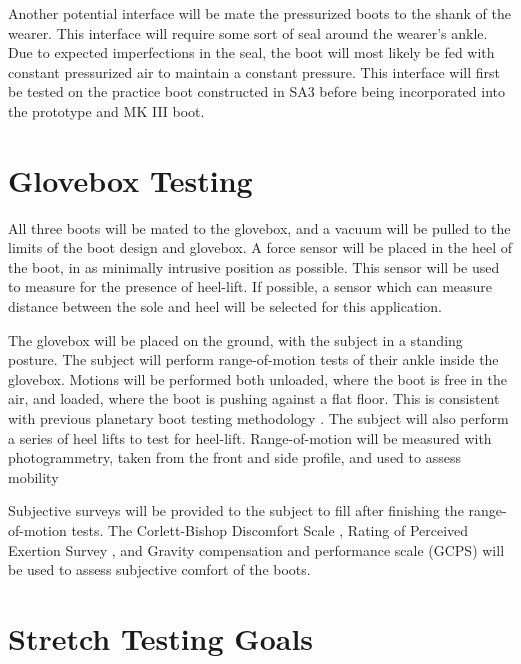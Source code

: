 \documentclass[defaultstyle,11pt]{comps}
\begin{document}
Another potential interface will be mate the pressurized boots to the shank of the wearer.
This interface will require some sort of seal around the wearer's ankle.
Due to expected imperfections in the seal, the boot will most likely be fed with constant pressurized air to maintain a constant pressure.
This interface will first be tested on the practice boot constructed in SA3 before being incorporated into the prototype and MK III boot.

\hypertarget{glovebox-testing}{%
\section{Glovebox Testing}\label{glovebox-testing}}

All three boots will be mated to the glovebox, and a vacuum will be pulled to the limits of the boot design and glovebox.
A force sensor will be placed in the heel of the boot, in as minimally intrusive position as possible.
This sensor will be used to measure for the presence of heel-lift.
If possible, a sensor which can measure distance between the sole and heel will be selected for this application.

The glovebox will be placed on the ground, with the subject in a standing posture.
The subject will perform range-of-motion tests of their ankle inside the glovebox.
Motions will be performed both unloaded, where the boot is free in the air, and loaded, where the boot is pushing against a flat floor.
This is consistent with previous planetary boot testing methodology \citep{Ross2002}.
The subject will also perform a series of heel lifts to test for heel-lift.
Range-of-motion will be measured with photogrammetry, taken from the front and side profile, and used to assess mobility

Subjective surveys will be provided to the subject to fill after finishing the range-of-motion tests. The Corlett-Bishop Discomfort Scale \citep{Corlett1976}, Rating of Perceived Exertion Survey \citep{Borg1982}, and Gravity compensation and performance scale (GCPS) \citep{Gernhardt2009, Norcross2009, Norcross2010} will be used to assess subjective comfort of the boots.

\hypertarget{stretch-testing-goals}{%
\section{Stretch Testing Goals}\label{stretch-testing-goals}}
\end{document}
